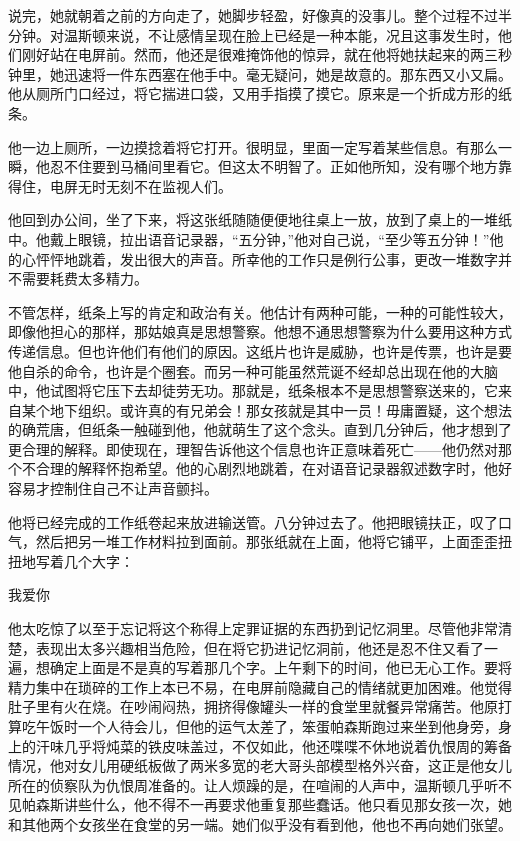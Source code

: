 说完，她就朝着之前的方向走了，她脚步轻盈，好像真的没事儿。整个过程不过半分钟。对温斯顿来说，不让感情呈现在脸上已经是一种本能，况且这事发生时，他们刚好站在电屏前。然而，他还是很难掩饰他的惊异，就在他将她扶起来的两三秒钟里，她迅速将一件东西塞在他手中。毫无疑问，她是故意的。那东西又小又扁。他从厕所门口经过，将它揣进口袋，又用手指摸了摸它。原来是一个折成方形的纸条。

他一边上厕所，一边摸捻着将它打开。很明显，里面一定写着某些信息。有那么一瞬，他忍不住要到马桶间里看它。但这太不明智了。正如他所知，没有哪个地方靠得住，电屏无时无刻不在监视人们。

他回到办公间，坐了下来，将这张纸随随便便地往桌上一放，放到了桌上的一堆纸中。他戴上眼镜，拉出语音记录器，``五分钟，''他对自己说，``至少等五分钟！''他的心怦怦地跳着，发出很大的声音。所幸他的工作只是例行公事，更改一堆数字并不需要耗费太多精力。

不管怎样，纸条上写的肯定和政治有关。他估计有两种可能，一种的可能性较大，即像他担心的那样，那姑娘真是思想警察。他想不通思想警察为什么要用这种方式传递信息。但也许他们有他们的原因。这纸片也许是威胁，也许是传票，也许是要他自杀的命令，也许是个圈套。而另一种可能虽然荒诞不经却总出现在他的大脑中，他试图将它压下去却徒劳无功。那就是，纸条根本不是思想警察送来的，它来自某个地下组织。或许真的有兄弟会！那女孩就是其中一员！毋庸置疑，这个想法的确荒唐，但纸条一触碰到他，他就萌生了这个念头。直到几分钟后，他才想到了更合理的解释。即使现在，理智告诉他这个信息也许正意味着死亡------他仍然对那个不合理的解释怀抱希望。他的心剧烈地跳着，在对语音记录器叙述数字时，他好容易才控制住自己不让声音颤抖。

他将已经完成的工作纸卷起来放进输送管。八分钟过去了。他把眼镜扶正，叹了口气，然后把另一堆工作材料拉到面前。那张纸就在上面，他将它铺平，上面歪歪扭扭地写着几个大字：

我爱你

他太吃惊了以至于忘记将这个称得上定罪证据的东西扔到记忆洞里。尽管他非常清楚，表现出太多兴趣相当危险，但在将它扔进记忆洞前，他还是忍不住又看了一遍，想确定上面是不是真的写着那几个字。上午剩下的时间，他已无心工作。要将精力集中在琐碎的工作上本已不易，在电屏前隐藏自己的情绪就更加困难。他觉得肚子里有火在烧。在吵闹闷热，拥挤得像罐头一样的食堂里就餐异常痛苦。他原打算吃午饭时一个人待会儿，但他的运气太差了，笨蛋帕森斯跑过来坐到他身旁，身上的汗味几乎将炖菜的铁皮味盖过，不仅如此，他还喋喋不休地说着仇恨周的筹备情况，他对女儿用硬纸板做了两米多宽的老大哥头部模型格外兴奋，这正是他女儿所在的侦察队为仇恨周准备的。让人烦躁的是，在喧闹的人声中，温斯顿几乎听不见帕森斯讲些什么，他不得不一再要求他重复那些蠢话。他只看见那女孩一次，她和其他两个女孩坐在食堂的另一端。她们似乎没有看到他，他也不再向她们张望。

